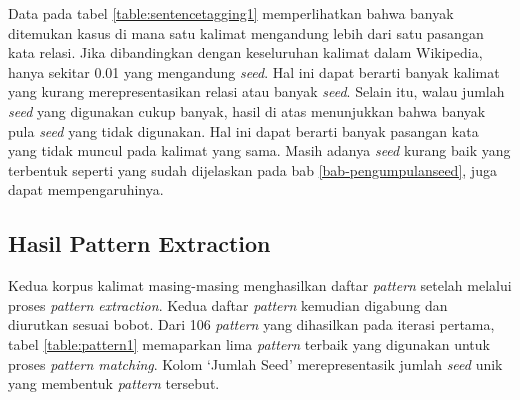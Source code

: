 \begin{table}
  \centering
  \caption{Hasil \textit{sentence tagging} dengan \textit{seed}}
  \label{table:sentencetagging1}
\end{table}

\noindent Data pada tabel \ref{table:sentencetagging1} memperlihatkan bahwa banyak ditemukan kasus di mana satu kalimat mengandung lebih dari satu pasangan kata relasi. Jika dibandingkan dengan keseluruhan kalimat dalam Wikipedia, hanya sekitar 0.01 yang mengandung \textit{seed}. Hal ini dapat berarti banyak kalimat yang kurang merepresentasikan relasi atau banyak \textit{seed}. Selain itu, walau jumlah \textit{seed} yang digunakan cukup banyak, hasil di atas menunjukkan bahwa banyak pula \textit{seed} yang tidak digunakan. Hal ini dapat berarti banyak pasangan kata yang tidak muncul pada kalimat yang sama. Masih adanya \textit{seed} kurang baik yang terbentuk seperti yang sudah dijelaskan pada bab \ref{bab-pengumpulanseed}, juga dapat mempengaruhinya.

\subsection{Hasil Pattern Extraction}
Kedua korpus kalimat masing-masing menghasilkan daftar \textit{pattern} setelah melalui proses \textit{pattern extraction}. Kedua daftar \textit{pattern} kemudian digabung dan diurutkan sesuai bobot. Dari 106 \textit{pattern} yang dihasilkan pada iterasi pertama, tabel \ref{table:pattern1} memaparkan lima \textit{pattern} terbaik yang digunakan untuk proses \textit{pattern matching}. Kolom `Jumlah Seed' merepresentasik jumlah \textit{seed} unik yang membentuk \textit{pattern} tersebut.


